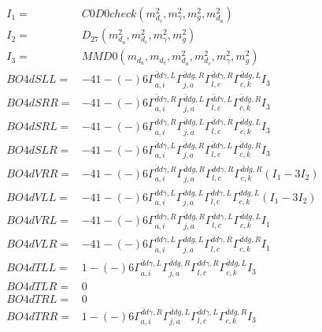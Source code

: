 \documentclass[A4,landscape]{article}
\begin{document}
\begin{align} 
I_1 = & C0D0check(m^2_{d_{{c}}}, m^2_{\gamma}, m^2_{g}, m^2_{d_{{a}}}) \\ 
I_2 = & D_{27}(m^2_{d_{{a}}}, m^2_{d_{{c}}}, m^2_{\gamma}, m^2_{g}) \\ 
I_3 = & MMD0(m_{d_{{a}}}, m_{d_{{c}}}, m^2_{d_{{a}}}, m^2_{d_{{c}}}, m^2_{\gamma}, m^2_{g}) \\ 
  BO4dSLL= & -4   1
-(-)
  6 \Gamma^{\bar{d}d \gamma ,L}_{a, i} \Gamma^{\bar{d}d g ,R}_{j, a} \Gamma^{\bar{d}d \gamma ,R}_{l, c} \Gamma^{\bar{d}d g ,L}_{c, k} I_3 \\ 
  BO4dSRR= & -4   1
-(-)
  6 \Gamma^{\bar{d}d \gamma ,R}_{a, i} \Gamma^{\bar{d}d g ,L}_{j, a} \Gamma^{\bar{d}d \gamma ,L}_{l, c} \Gamma^{\bar{d}d g ,R}_{c, k} I_3 \\ 
  BO4dSRL= & -4   1
-(-)
  6 \Gamma^{\bar{d}d \gamma ,R}_{a, i} \Gamma^{\bar{d}d g ,L}_{j, a} \Gamma^{\bar{d}d \gamma ,R}_{l, c} \Gamma^{\bar{d}d g ,L}_{c, k} I_3 \\ 
  BO4dSLR= & -4   1
-(-)
  6 \Gamma^{\bar{d}d \gamma ,L}_{a, i} \Gamma^{\bar{d}d g ,R}_{j, a} \Gamma^{\bar{d}d \gamma ,L}_{l, c} \Gamma^{\bar{d}d g ,R}_{c, k} I_3 \\ 
  BO4dVRR= & -4   1
-(-)
  6 \Gamma^{\bar{d}d \gamma ,R}_{a, i} \Gamma^{\bar{d}d g ,R}_{j, a} \Gamma^{\bar{d}d \gamma ,R}_{l, c} \Gamma^{\bar{d}d g ,R}_{c, k} (I_1 - 3 I_2) \\ 
  BO4dVLL= & -4   1
-(-)
  6 \Gamma^{\bar{d}d \gamma ,L}_{a, i} \Gamma^{\bar{d}d g ,L}_{j, a} \Gamma^{\bar{d}d \gamma ,L}_{l, c} \Gamma^{\bar{d}d g ,L}_{c, k} (I_1 - 3 I_2) \\ 
  BO4dVRL= & -4   1
-(-)
  6 \Gamma^{\bar{d}d \gamma ,R}_{a, i} \Gamma^{\bar{d}d g ,R}_{j, a} \Gamma^{\bar{d}d \gamma ,L}_{l, c} \Gamma^{\bar{d}d g ,L}_{c, k} I_1 \\ 
  BO4dVLR= & -4   1
-(-)
  6 \Gamma^{\bar{d}d \gamma ,L}_{a, i} \Gamma^{\bar{d}d g ,L}_{j, a} \Gamma^{\bar{d}d \gamma ,R}_{l, c} \Gamma^{\bar{d}d g ,R}_{c, k} I_1 \\ 
  BO4dTLL= &   1
-(-)
  6 \Gamma^{\bar{d}d \gamma ,L}_{a, i} \Gamma^{\bar{d}d g ,R}_{j, a} \Gamma^{\bar{d}d \gamma ,R}_{l, c} \Gamma^{\bar{d}d g ,L}_{c, k} I_3 \\ 
  BO4dTLR= & 0 \\ 
  BO4dTRL= & 0 \\ 
  BO4dTRR= &   1
-(-)
  6 \Gamma^{\bar{d}d \gamma ,R}_{a, i} \Gamma^{\bar{d}d g ,L}_{j, a} \Gamma^{\bar{d}d \gamma ,L}_{l, c} \Gamma^{\bar{d}d g ,R}_{c, k} I_3 \\ 
\end{align} 
\end{document}

